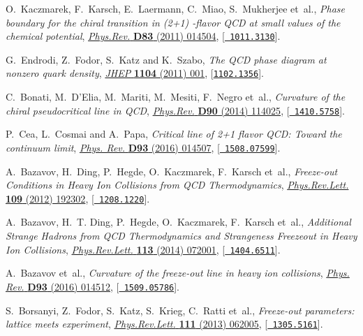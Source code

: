 \documentclass{PoS}
\begin{document}
\begin{thebibliography}{100}
O.~Kaczmarek, F.~Karsch, E.~Laermann, C.~Miao, S.~Mukherjee et~al.,
  \emph{{Phase boundary for the chiral transition in (2+1) -flavor QCD at small
  values of the chemical potential}},
  \href{http://dx.doi.org/10.1103/PhysRevD.83.014504}{\emph{Phys.Rev.} {\bf
  D83} (2011) 014504}, [\href{https://arxiv.org/abs/1011.3130}{{\tt
  1011.3130}}].

G.~Endrodi, Z.~Fodor, S.~Katz and K.~Szabo, \emph{{The QCD phase diagram at
  nonzero quark density}},
  \href{http://dx.doi.org/10.1007/JHEP04(2011)001}{\emph{JHEP} {\bf 1104}
  (2011) 001}, [\href{https://arxiv.org/abs/1102.1356}{{\tt 1102.1356}}].

C.~Bonati, M.~D'Elia, M.~Mariti, M.~Mesiti, F.~Negro et~al., \emph{{Curvature
  of the chiral pseudocritical line in QCD}},
  \href{http://dx.doi.org/10.1103/PhysRevD.90.114025}{\emph{Phys.Rev.} {\bf
  D90} (2014) 114025}, [\href{https://arxiv.org/abs/1410.5758}{{\tt
  1410.5758}}].

P.~Cea, L.~Cosmai and A.~Papa, \emph{{Critical line of 2+1 flavor QCD: Toward
  the continuum limit}},
  \href{http://dx.doi.org/10.1103/PhysRevD.93.014507}{\emph{Phys. Rev.} {\bf
  D93} (2016) 014507}, [\href{https://arxiv.org/abs/1508.07599}{{\tt
  1508.07599}}].

A.~Bazavov, H.~Ding, P.~Hegde, O.~Kaczmarek, F.~Karsch et~al.,
  \emph{{Freeze-out Conditions in Heavy Ion Collisions from QCD
  Thermodynamics}},
  \href{http://dx.doi.org/10.1103/PhysRevLett.109.192302}{\emph{Phys.Rev.Lett.}
  {\bf 109} (2012) 192302}, [\href{https://arxiv.org/abs/1208.1220}{{\tt
  1208.1220}}].

A.~Bazavov, H.~T. Ding, P.~Hegde, O.~Kaczmarek, F.~Karsch et~al.,
  \emph{{Additional Strange Hadrons from QCD Thermodynamics and Strangeness
  Freezeout in Heavy Ion Collisions}},
  \href{http://dx.doi.org/10.1103/PhysRevLett.113.072001}{\emph{Phys.Rev.Lett.}
  {\bf 113} (2014) 072001}, [\href{https://arxiv.org/abs/1404.6511}{{\tt
  1404.6511}}].

A.~Bazavov et~al., \emph{{Curvature of the freeze-out line in heavy ion
  collisions}}, \href{http://dx.doi.org/10.1103/PhysRevD.93.014512}{\emph{Phys.
  Rev.} {\bf D93} (2016) 014512}, [\href{https://arxiv.org/abs/1509.05786}{{\tt
  1509.05786}}].

S.~Borsanyi, Z.~Fodor, S.~Katz, S.~Krieg, C.~Ratti et~al., \emph{{Freeze-out
  parameters: lattice meets experiment}},
  \href{http://dx.doi.org/10.1103/PhysRevLett.111.062005}{\emph{Phys.Rev.Lett.}
  {\bf 111} (2013) 062005}, [\href{https://arxiv.org/abs/1305.5161}{{\tt
  1305.5161}}].


\end{thebibliography}
\end{document}
